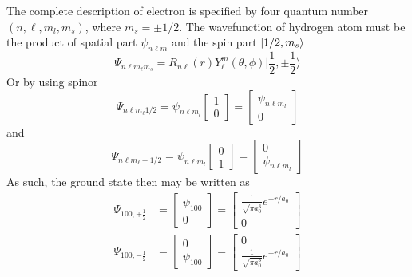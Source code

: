 \documentclass[../../../main.tex]{subfiles}
\begin{document}
  The complete description of electron is specified by four quantum number $(n,\ell,m_l,m_s)$, where $m_s=\pm 1/2$.
  The wavefunction of hydrogen atom must be the product of spatial part $\psi_{n\ell m}$ and the spin part $\ket{1/2,m_s}$
  \begin{equation*}
    \Psi_{n\ell m_\ell m_s}=R_{n\ell}(r) Y_{\ell}^{m}(\theta, \phi) \Bigg| \frac{1}{2}, \pm \frac{1}{2} \Bigg\rangle
  \end{equation*}
  Or by using spinor
  \begin{equation*}
    \Psi_{n\ell m_\ell 1/2}=\psi_{n\ell m_l}
    \begin{bmatrix}
      1 \\0
    \end{bmatrix}
    =
    \begin{bmatrix}
      \psi_{n\ell m_l} \\0
    \end{bmatrix}
  \end{equation*}
  and
  \begin{equation*}
    \Psi_{n\ell m_\ell -1/2}=\psi_{n\ell m_l}
    \begin{bmatrix}
      0 \\1
    \end{bmatrix}
    =
    \begin{bmatrix}
      0 \\\psi_{n\ell m_l}
    \end{bmatrix}
  \end{equation*}
  As such, the ground state then may be written as
  \begin{align*}
    \Psi_{100,+\frac{1}{2}} & =  \begin{bmatrix} \psi_{100} \\ 0 \end{bmatrix} = \begin{bmatrix} \frac{1}{\sqrt{\pi a_0^3}}e^{-r/a_0} \\ 0 \end{bmatrix} \\
    \Psi_{100,-\frac{1}{2}} & =  \begin{bmatrix}0\\ \psi_{100} \end{bmatrix} = \begin{bmatrix} 0\\ \frac{1}{\sqrt{\pi a_0^3}}e^{-r/a_0}  \end{bmatrix}
  \end{align*}
\end{document}
